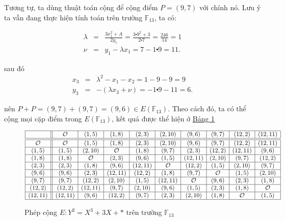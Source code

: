 Tương tự, ta dùng thuật toán cộng để cộng điểm $P = (9,7)$ với chính nó. Lưu ý ta vẫn đang thực hiện tính toán trên trường $\mathbb{F}_{13}$, ta có:

$$
	\begin{array}{rcl}
		\lambda & = & \frac{3x_1^2+A}{2y_1} = \frac{3\centerdot 9^ 2 + 3}{2 \centerdot 7} = \frac{246}{14} = 1 \\
		\nu     & = & y_1-\lambda x_1 = 7 - 1 \centerdot 9 = 11 .
	\end{array}
$$

sau đó
$$
	\begin{array}{rcl}
		x_3 & = & \lambda^2 - x_1 - x_2 = 1 - 9 - 9 = 9          \\
		y_3 & = & -(\lambda x_3 + \nu) = -1 \centerdot 9 -11 =6.
	\end{array}
$$

nên $P+P = (9,7) + (9,7) = (9,6) \in E(\mathbb{F}_{13})$. Theo cách đó, ta có thể cộng mọi cặp điểm trong $E(\mathbb{F}_{13})$, kết quả được thể hiện ở \hyperref[fg:tb1]{Bảng 1}


\begin{figure}[H]
	\label{fg:tb1}
	\caption{Phép cộng $E: Y^2 = X^3 + 3X + *$ trên trường $\mathbb{F}_{13}$}
	$
		\begin{array}{|c||c|c|c|c|c|c|c|c|c|}
			\hline
			            & \mathcal{O} & (1,5)       & (1,8)       & (2,3)   & (2,10)      & (9,6)       & (9,7)       & (12,2)      & (12,11)     \\
			\hline
			\hline
			\mathcal{O} & \mathcal{O} & (1,5)       & (1,8)       & (2,3)   & (2,10)      & (9,6)       & (9,7)       & (12,2)      & (12,11)     \\
			\hline
			(1,5)       & (1,5)       & (2,10)      & \mathcal{O} & (1,8)   & (9,7)       & (2,3)       & (12,2)      & (12,11)     & (9,6)       \\
			\hline
			(1,8)       & (1,8)       & \mathcal{O} & (2,3)       & (9,6)   & (1,5)       & (12,11)     & (2,10)      & (9,7)       & (12,2)      \\
			\hline
			(2,3)       & (2,3)       & (1,8)       & (9,6)       & (12,11) & \mathcal{O} & (12,2)      & (1,5)       & (2,10)      & (9,7)       \\
			\hline
			(9,6)       & (9,6)       & (2,3)       & (12,11)     & (12,2)  & (1,8)       & (9,7)       & \mathcal{O} & (1,5)       & (2,10)      \\
			\hline
			(9,7)       & (9,7)       & (12,2)      & (2,10)      & (1,5)   & (12,11)     & \mathcal{O} & (9,6)       & (2,3)       & (1,8)       \\
			\hline
			(12,2)      & (12,2)      & (12,11)     & (9,7)       & (2,10)  & (9,6)       & (1,5)       & (2,3)       & (1,8)       & \mathcal{O} \\
			\hline
			(12,11)     & (12,11)     & (9,6)       & (12,2)      & (9,7)   & (2,3)       & (2,10)      & (1,8)       & \mathcal{O} & (1,5)       \\
			\hline
		\end{array}
	$
\end{figure}


